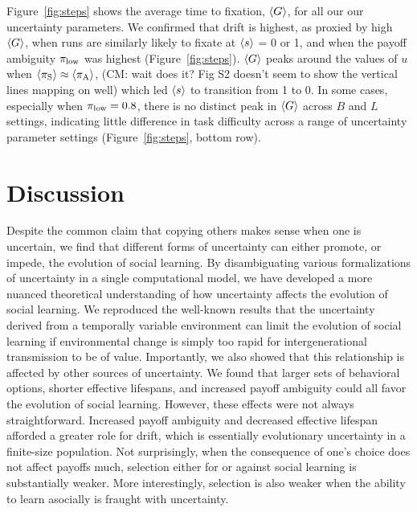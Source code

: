 \documentclass[letterpaper,11.5pt]{scrartcl}
\newcommand{\cm}[1]{{\textcolor{mypurple} {({\tiny CM:} #1)}}}
\begin{document}
Figure~\ref{fig:steps} shows the average time to fixation, $\langle G \rangle$, for all our our uncertainty parameters. We confirmed that drift is highest, as proxied by high $\langle G \rangle$, when runs are similarly likely to fixate at $\langle s \rangle$ = 0 or 1, 
and when the payoff ambiguity $\pi_{\mathrm{low}}$ was highest (Figure~\ref{fig:steps}). 
$\langle G \rangle$ peaks around the values of $u$ 
when $\langle \pi_\mathrm{S} \rangle \approx \langle \pi_\mathrm{A} \rangle$, \cm{wait does it? Fig S2 doesn't seem to show the vertical lines mapping on well} which led $\langle s \rangle$ to transition from 1 to 0.
In some cases, especially when $\pi_{\mathrm{low}}=0.8$,
there is no distinct peak in $\langle G \rangle$ across $B$ and $L$ settings, 
indicating little difference in task difficulty across a range of uncertainty
parameter settings (Figure~\ref{fig:steps}, bottom row).


\section{Discussion}

 Despite the common claim that copying others makes sense when one is uncertain, we find that different forms of uncertainty can either promote, or impede, the evolution of social learning. By disambiguating various formalizations of uncertainty in a single computational model, we have developed a more nuanced theoretical understanding of how uncertainty affects the evolution of social learning.
We reproduced the well-known results that the uncertainty derived from a temporally variable environment can limit the evolution of social learning if environmental change is simply too rapid for intergenerational transmission to be of value. Importantly, we also showed that this relationship is affected by other sources of uncertainty. 
We found that larger sets of behavioral options, shorter effective lifespans, and increased payoff ambiguity could all favor the evolution of social learning. However, these effects were not always straightforward. 
Increased payoff ambiguity and decreased effective lifespan afforded a greater role for drift, which is essentially
evolutionary uncertainty in a finite-size population. Not surprisingly, when the consequence of one's choice does not affect payoffs much, selection either for or against social learning is substantially weaker. More interestingly, selection is also weaker when the ability to learn asocially is fraught with uncertainty.
\end{document}
